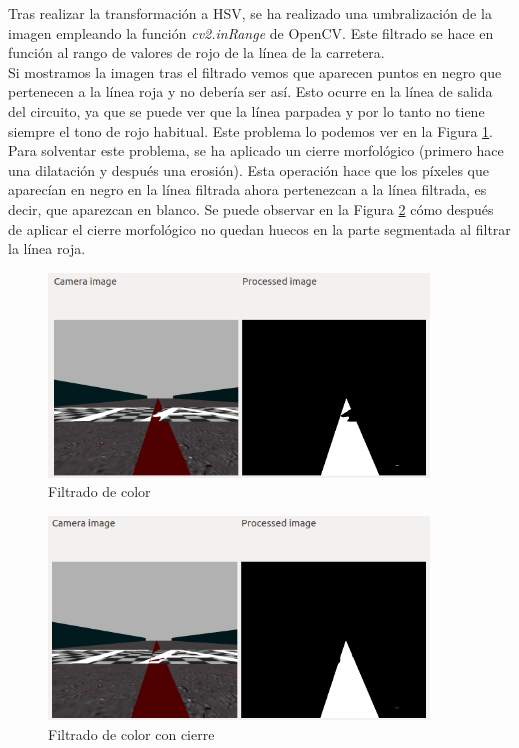 Tras realizar la transformación a HSV, se ha realizado una umbralización de la imagen empleando la función \textit{cv2.inRange} de OpenCV. Este filtrado se hace en función al rango de valores de rojo de la línea de la carretera.\\

Si mostramos la imagen tras el filtrado vemos que aparecen puntos en negro que pertenecen a la línea roja y no debería ser así. Esto ocurre en la línea de salida del circuito, ya que se puede ver que la línea parpadea y por lo tanto no tiene siempre el tono de rojo habitual. Este problema lo podemos ver en la Figura \ref{fig.color}. Para solventar este problema, se ha aplicado un cierre morfológico (primero hace una dilatación y después una erosión). Esta operación hace que los píxeles que aparecían en negro en la línea filtrada ahora pertenezcan a la línea filtrada, es decir, que aparezcan en blanco. Se puede observar en la Figura \ref{fig.cierre} cómo después de aplicar el cierre morfológico no quedan huecos en la parte segmentada al filtrar la línea roja.\\

\begin{figure}
  \begin{center}
    \includegraphics[width=0.9\textwidth]{figures/Infraestructura/filtro_color.png}
		\caption{Filtrado de color}
		\label{fig.color}
		\end{center}
\end{figure}


\begin{figure}
  \begin{center}
    \includegraphics[width=0.9\textwidth]{figures/Infraestructura/filtro_cierre.png}
		\caption{Filtrado de color con cierre}
		\label{fig.cierre}
		\end{center}
\end{figure}

